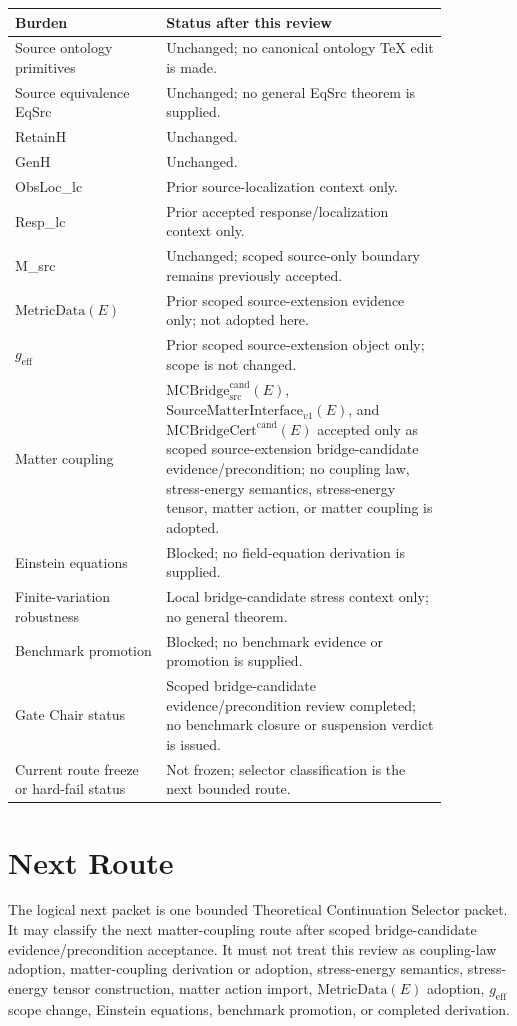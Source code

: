 \documentclass[11pt]{article}
\newcommand{\MetricData}{\mathrm{MetricData}}
\newcommand{\geff}{g_{\mathrm{eff}}}
\newcommand{\MCBridgeCand}{\mathrm{MCBridge}_{\mathrm{src}}^{\mathrm{cand}}}
\newcommand{\MCBridgeCertCand}{\mathrm{MCBridgeCert}^{\mathrm{cand}}}
\newcommand{\SMI}{\mathrm{SourceMatterInterface}_{v1}}
\begin{document}
\begin{longtable}{p{0.30\linewidth}p{0.56\linewidth}}
\toprule
Burden & Status after this review \\
\midrule
Source ontology primitives & Unchanged; no canonical ontology TeX edit is made. \\
Source equivalence EqSrc & Unchanged; no general EqSrc theorem is supplied. \\
RetainH & Unchanged. \\
GenH & Unchanged. \\
ObsLoc\_lc & Prior source-localization context only. \\
Resp\_lc & Prior accepted response/localization context only. \\
M\_src & Unchanged; scoped source-only boundary remains previously accepted. \\
\(\MetricData(E)\) & Prior scoped source-extension evidence only; not adopted here. \\
\(\geff\) & Prior scoped source-extension object only; scope is not changed. \\
Matter coupling & \(\MCBridgeCand(E)\), \(\SMI(E)\), and \(\MCBridgeCertCand(E)\) accepted only as scoped source-extension bridge-candidate evidence/precondition; no coupling law, stress-energy semantics, stress-energy tensor, matter action, or matter coupling is adopted. \\
Einstein equations & Blocked; no field-equation derivation is supplied. \\
Finite-variation robustness & Local bridge-candidate stress context only; no general theorem. \\
Benchmark promotion & Blocked; no benchmark evidence or promotion is supplied. \\
Gate Chair status & Scoped bridge-candidate evidence/precondition review completed; no benchmark closure or suspension verdict is issued. \\
Current route freeze or hard-fail status & Not frozen; selector classification is the next bounded route. \\
\bottomrule
\end{longtable}

\section{Next Route}

The logical next packet is one bounded Theoretical Continuation Selector
packet. It may classify the next matter-coupling route after scoped
bridge-candidate evidence/precondition acceptance. It must not treat this
review as coupling-law adoption, matter-coupling derivation or adoption,
stress-energy semantics, stress-energy tensor construction, matter action
import, \(\MetricData(E)\) adoption, \(\geff\) scope change, Einstein
equations, benchmark promotion, or completed derivation.
\end{document}
